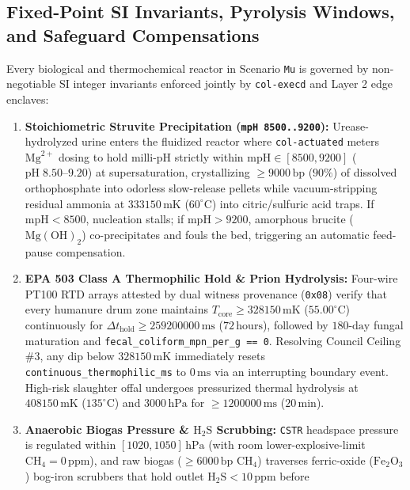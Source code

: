 \subsection{Fixed-Point SI Invariants, Pyrolysis Windows, and Safeguard Compensations}

Every biological and thermochemical reactor in Scenario \texttt{Mu} is governed by non-negotiable SI integer invariants enforced jointly by
\texttt{col-execd} and Layer 2 edge enclaves:
\begin{enumerate}
    \item \textbf{Stoichiometric Struvite Precipitation (\texttt{mpH 8500..9200}):} Urease-hydrolyzed urine enters the fluidized reactor where
    \texttt{col-actuated} meters $\mathrm{Mg}^{2+}$ dosing to hold milli-pH strictly within $\mathrm{mpH} \in [8500, 9200]$
    ($\mathrm{pH}\;8.50\text{--}9.20$) at supersaturation, crystallizing $\ge 9000\,\mathrm{bp}$ ($90\%$) of dissolved orthophosphate into
    odorless slow-release pellets while vacuum-stripping residual ammonia at $333150\,\mathrm{mK}$ ($60^\circ\mathrm{C}$) into citric/sulfuric
    acid traps. If $\mathrm{mpH} < 8500$, nucleation stalls; if $\mathrm{mpH} > 9200$, amorphous brucite ($\mathrm{Mg(OH)}_2$) co-precipitates
    and fouls the bed, triggering an automatic feed-pause compensation.
    \item \textbf{EPA 503 Class A Thermophilic Hold \& Prion Hydrolysis:} Four-wire PT100 RTD arrays attested by dual witness provenance
    (\texttt{0x08}) verify that every humanure drum zone maintains $T_{\mathrm{core}} \ge 328150\,\mathrm{mK}$ ($55.00^\circ\mathrm{C}$)
    continuously for $\Delta t_{\mathrm{hold}} \ge 259200000\,\mathrm{ms}$ ($72\,\mathrm{hours}$), followed by $180\text{-day}$ fungal maturation
    and \texttt{fecal\_coliform\_mpn\_per\_g == 0}. Resolving Council Ceiling \#3, any dip below $328150\,\mathrm{mK}$ immediately resets
    \texttt{continuous\_thermophilic\_ms} to $0\,\mathrm{ms}$ via an interrupting boundary event. High-risk slaughter offal undergoes pressurized
    thermal hydrolysis at $408150\,\mathrm{mK}$ ($135^\circ\mathrm{C}$) and $3000\,\mathrm{hPa}$ for $\ge 1200000\,\mathrm{ms}$
    ($20\,\mathrm{min}$).
    \item \textbf{Anaerobic Biogas Pressure \& $\mathrm{H_2S}$ Scrubbing:} \texttt{CSTR} headspace pressure is regulated within
    $[1020, 1050]\,\mathrm{hPa}$ (with room lower-explosive-limit $\mathrm{CH}_4 = 0\,\mathrm{ppm}$), and raw biogas ($\ge 6000\,\mathrm{bp}$
    $\mathrm{CH}_4$) traverses ferric-oxide ($\mathrm{Fe_2O_3}$) bog-iron scrubbers that hold outlet $\mathrm{H_2S} < 10\,\mathrm{ppm}$ before

\end{enumerate}
